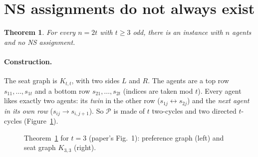 \documentclass[11pt,a4paper]{article}
\newtheorem{theorem}{Theorem}
\theoremstyle{definition}
\theoremstyle{remark}
\theoremstyle{plain}
\newcommand{\cP}{\mathcal{P}}
\begin{document}
\section{NS assignments do not always exist}

\begin{theorem}\label{thm:kTT}
For every $n=2t$ with $t\ge3$ odd, there is an instance with $n$ agents and no NS assignment.
\end{theorem}

\paragraph{Construction.} The seat graph is $K_{t,t}$, with two sides $L$ and $R$. The agents are a top row $s_{11},\dots,s_{1t}$ and a bottom row $s_{21},\dots,s_{2t}$ (indices are taken mod $t$). Every agent likes exactly two agents: its \emph{twin} in the other row ($s_{1j}\leftrightarrow s_{2j}$) and the \emph{next agent in its own row} ($s_{ij}\to s_{i,j+1}$). So $\cP$ is made of $t$ two-cycles and two directed $t$-cycles (Figure~\ref{fig:k33}).

\begin{figure}[h]
\centering
{}
\caption{Theorem~\ref{thm:kTT} for $t=3$ (paper's Fig.~1): preference graph (left) and seat graph $K_{3,3}$ (right).}
\label{fig:k33}
\end{figure}
\end{document}
